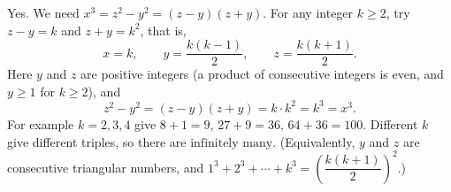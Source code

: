 Yes. We need $x^3=z^2-y^2=(z-y)(z+y)$. For any integer $k\ge2$, try $z-y=k$ and $z+y=k^2$, that is,
\[
x=k,\qquad y=\dfrac{k(k-1)}{2},\qquad z=\dfrac{k(k+1)}{2}.
\]
Here $y$ and $z$ are positive integers (a product of consecutive integers is even, and $y\ge1$ for $k\ge2$), and
\[
z^2-y^2=(z-y)(z+y)=k\cdot k^2=k^3=x^3 .
\]
For example $k=2,3,4$ give $8+1=9$, $27+9=36$, $64+36=100$. Different $k$ give different triples, so there are $\boxed{\text{infinitely many}}$. (Equivalently, $y$ and $z$ are consecutive triangular numbers, and $1^3+2^3+\cdots+k^3=\left(\dfrac{k(k+1)}{2}\right)^2$.)
